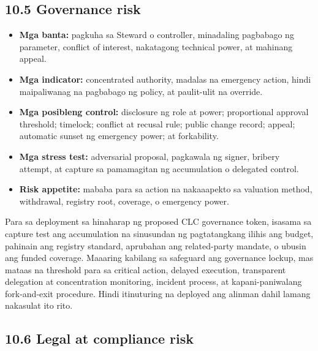 \documentclass[11pt]{article}
\begin{document}
\subsection*{10.5 Governance risk}

\begin{itemize}[leftmargin=*]
\item \textbf{Mga banta:} pagkuha sa Steward o controller, minadaling pagbabago ng parameter, conflict of interest, nakatagong technical power, at mahinang appeal.
\item \textbf{Mga indicator:} concentrated authority, madalas na emergency action, hindi maipaliwanag na pagbabago ng policy, at paulit-ulit na override.
\item \textbf{Mga posibleng control:} disclosure ng role at power; proportional approval threshold; timelock; conflict at recusal rule; public change record; appeal; automatic sunset ng emergency power; at forkability.
\item \textbf{Mga stress test:} adversarial proposal, pagkawala ng signer, bribery attempt, at capture sa pamamagitan ng accumulation o delegated control.
\item \textbf{Risk appetite:} mababa para sa action na nakaaapekto sa valuation method, withdrawal, registry root, coverage, o emergency power.
\end{itemize}
Para sa deployment sa hinaharap ng proposed CLC governance token, isasama sa capture test ang accumulation na sinusundan ng pagtatangkang ilihis ang budget, pahinain ang registry standard, aprubahan ang related-party mandate, o ubusin ang funded coverage. Maaaring kabilang sa safeguard ang governance lockup, mas mataas na threshold para sa critical action, delayed execution, transparent delegation at concentration monitoring, incident process, at kapani-paniwalang fork-and-exit procedure. Hindi itinuturing na deployed ang alinman dahil lamang nakasulat ito rito.

\subsection*{10.6 Legal at compliance risk}
\end{document}
